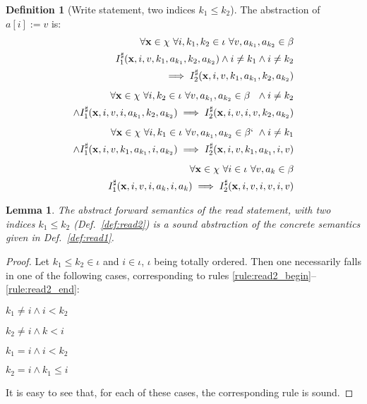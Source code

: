 \documentclass[a4paper]{article}
\newcommand{\ve}[1]{\mathbf{#1}}
\newcommand{\vx}{\ve{x}}
\newcommand{\abstr}[1]{#1^\sharp}
\theoremstyle{definition}
\newtheorem{definition}{Definition}
\theoremstyle{plain}
\newtheorem{lemma}[theorem]{Lemma}
\newcommand{\rulespacing}{\\[0.4em]}
\begin{document}
\begin{definition}[Write statement, two indices $k_1 \leq k_2$]\label{def:write2}
The abstraction of $a[i]:=v$ is:
{\small\begin{align}
\begin{aligned}
\forall \vx \in \chi~ \forall i,k_1,k_2\in\iota~ \forall v,a_{k_1},a_{k_2} \in \beta\\
  \abstr{I}_1(\vx, i, v, k_1, a_{k_1}, k_2, a_{k_2})
  \land i \neq k_1 \land i \neq k_2 \\ \implies
  \abstr{I}_2(\vx, i, v, k_1, a_{k_1}, k_2, a_{k_2})
\end{aligned}\rulespacing
\begin{aligned}
\forall \vx \in \chi~ \forall i, k_2\in\iota~
  \forall v,a_{k_1},a_{k_2} \in \beta~~ \land i \neq k_2 \\
  \land \abstr{I}_1(\vx, i, v, i, a_{k_1}, k_2, a_{k_2})
  \implies
  \abstr{I}_2(\vx, i, v, i, v, k_2, a_{k_2})
\end{aligned}\rulespacing
\begin{aligned}
\forall \vx \in \chi~ \forall i,k_1\in\iota~
  \forall v,a_{k_1},a_{k_2} \in \beta`~ \land i \neq k_1 \\
  \land \abstr{I}_1(\vx, i, v, k_1, a_{k_1}, i, a_{k_2})
  \implies
  \abstr{I}_2(\vx, i, v, k_1, a_{k_1}, i, v)
\end{aligned}\rulespacing
\begin{aligned}
\forall \vx \in \chi~ \forall i\in\iota~ \forall v,a_k \in \beta\\
  \abstr{I}_1(\vx, i, v, i, a_k, i, a_k)
  \implies
  \abstr{I}_2(\vx, i, v, i, v, i, v)
\end{aligned}
\end{align}}
\end{definition}

\begin{lemma}
The abstract forward semantics of the read statement, with two indices $k_1 \leq k_2$ (Def.~\ref{def:read2}) is a sound abstraction of the concrete semantics given in Def.~\ref{def:read1}.
\end{lemma}

\begin{proof}
Let $k_1 \leq k_2 \in \iota$ and $i \in \iota$, $\iota$ being totally ordered.
Then one necessarily falls in one of the following cases, corresponding to rules \ref{rule:read2_begin}--\ref{rule:read2_end}: 
\begin{inparaenum}[i)]
\item $k_1 \neq i \land i < k_2$
\item $k_2 \neq i \land k < i$
\item $k_1 = i \land i < k_2$
\item $k_2 = i \land k_1 \leq i$
\end{inparaenum}
It is easy to see that, for each of these cases, the corresponding rule is sound.
\end{proof}
\end{document}
